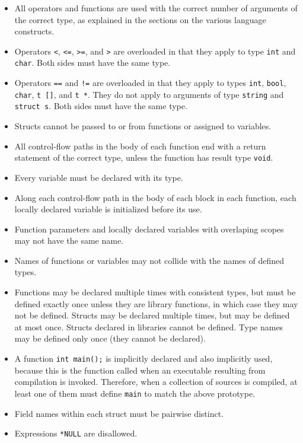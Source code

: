 \documentclass[11pt]{article}
\begin{document}
\begin{itemize}
\item All operators and functions are used with the
  correct number of arguments of the correct type,
  as explained in the sections on the various language
  constructs.
\item Operators \verb'<', \verb'<=', \verb'>=', and
  \verb'>' are overloaded in that they apply to
  type \verb'int' and \verb'char'.  Both sides must
  have the same type.
\item Operators \verb'==' and \verb'!=' are overloaded
  in that they apply to types \verb'int', \verb'bool',
  \verb'char', \verb't []', and \verb't *'.  They do
  not apply to arguments of type \verb'string' and
  \verb'struct s'.  Both sides must have the same type.
\item Structs cannot be passed to or from functions
  or assigned to variables.
\item All control-flow paths in the body of each function
  end with a return statement of the correct type,
  unless the function has result type \verb'void'.
\item Every variable must be declared with its type.
\item Along each control-flow path in the body of each
  block in each function, each locally declared variable
  is initialized before its use.
\item Function parameters and locally declared variables
  with overlaping scopes may not have the same name.
\item Names of functions or variables may not collide with the names
  of defined types.
\item Functions may be declared multiple times with consistent
  types, but must be defined exactly once unless they are library
  functions, in which case they may not be defined.  Structs may
  be declared multiple times, but may be defined at most once.
  Structs declared in libraries cannot be defined.  Type names may
  be defined only once (they cannot be declared).
\item A function \verb'int main();' is implicitly declared and
  also implicitly used, because this is the function called
  when an executable resulting from compilation is invoked.
  Therefore, when a collection of sources is compiled, at
  least one of them must define \verb'main' to match the
  above prototype.
\item Field names within each struct must be pairwise distinct.
\item Expressions \verb'*NULL' are disallowed.

\end{itemize}
\end{document}
